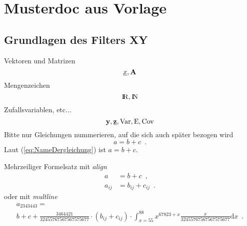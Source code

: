 \section{Musterdoc aus Vorlage}

\subsection{Grundlagen des Filters XY}
Vektoren und Matrizen
%
\begin{equation*}
	\underline{x}, {\mathbf A}
\end{equation*}
%
Mengenzeichen
%
\begin{equation*}
	\mathrm{I\hspace{-2pt}R}, \mathrm{I\hspace{-2pt}N}
\end{equation*}
%
Zufallsvariablen, etc...
%
\begin{equation*}
	{\mathbf y}, {\underline{{\mathbf z}}},
	\mathrm{Var}, \mathrm{E}, \mathrm{Cov}
\end{equation*}
%
Bitte nur Gleichungen nummerieren, auf die sich auch später bezogen wird
%
\begin{equation}
	a = b +c \enspace .
	\label{eq:NameDergleichung}
\end{equation}
%
Laut (\ref{eq:NameDergleichung}) ist $a=b+c$.

Mehrzeiliger Formelsatz mit \emph{align}
%
\begin{align*}
	a &= b + c \enspace ,\\
	a_{ij} &= b_{ij} + c_{ij} \enspace .
\end{align*}
%
oder mit \emph{multline}
%
\begin{multline*}
	a_{2343443} = \\
	b + c + \frac{3464421}{32455767567567575677} 
	\cdot \left( b_{ij} + c_{ij} \right)
	\cdot \int_{x=55}^{88} x^{67823+x} \frac{x}{32455767567567575677} \text{d}x
	\enspace .
\end{multline*}
%

%
